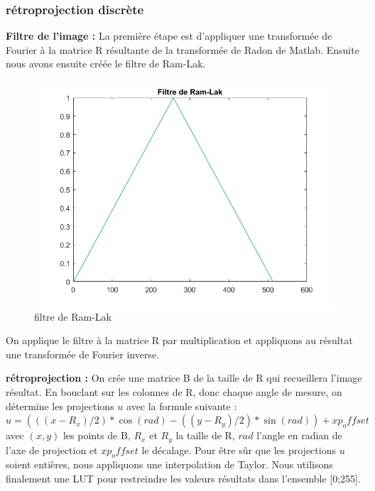 \documentclass[conference]{IEEEtran}
\begin{document}
\subsubsection{rétroprojection discrète}

\textbf{Filtre de l'image :} La première étape est d'appliquer une transformée de Fourier à la matrice R résultante de la transformée de Radon de Matlab. Ensuite nous avons ensuite créée le filtre de Ram-Lak.

\begin{figure}[H]
\centering
\includegraphics[scale=0.4]{filtre-de-Ram-Lak}
\caption[filtre de Ram-Lak]{filtre de Ram-Lak}
\label{fig:gallery}
\end{figure}

On applique le filtre à la matrice R par multiplication et appliquons au résultat une transformée de Fourier inverse.

\textbf{rétroprojection :} On crée une matrice B de la taille de R qui recueillera l'image résultat. En bouclant sur les colonnes de R, donc chaque angle de mesure, on détermine les projections $u$ avec la formule suivante :
$u=(((x-R_x)/2)*\cos(rad)-((y-R_y)/2)*\sin(rad))+xp_offset$
avec $(x,y)$ les points de B, $R_x$ et $R_y$ la taille de R, $rad$ l'angle en radian de l'axe de projection et $xp_offset$ le décalage.
Pour être sûr que les projections $u$ soient entières, nous appliquons une interpolation de Taylor.
Nous utilisons finalement une LUT pour restreindre les valeurs résultats dans l'ensemble [0;255].
\end{document}
